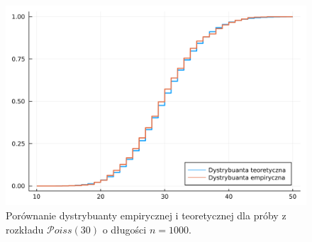 \documentclass[12pt]{mwrep}
\begin{document}
	\begin{figure}[H]
		\centering
		\caption{Porównanie dystrybuanty empirycznej i teoretycznej dla próby z rozkładu $\mathcal{P}oiss(30)$ o długości $n = 1000$.}
		\includegraphics[scale=0.1]{fig/fig_odwr1.png}
	\end{figure}
	
\end{document}

